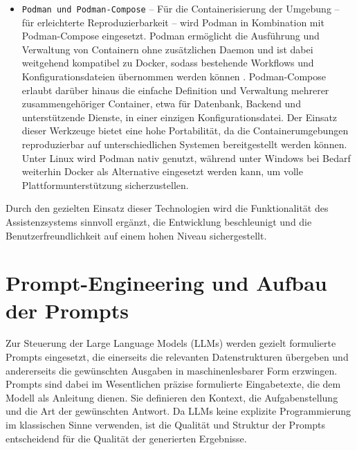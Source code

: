 \begin{itemize}
          \item \texttt{Podman und Podman-Compose} – Für die Containerisierung der Umgebung -- für erleichterte Reproduzierbarkeit -- wird Podman in Kombination mit Podman-Compose eingesetzt.
          Podman ermöglicht die Ausführung und Verwaltung von Containern ohne zusätzlichen Daemon und ist dabei weitgehend kompatibel zu Docker, sodass bestehende Workflows und Konfigurationsdateien übernommen werden können \autocite{podman_docs_2025}.
          Podman-Compose erlaubt darüber hinaus die einfache Definition und Verwaltung mehrerer zusammengehöriger Container, etwa für Datenbank, Backend und unterstützende Dienste, in einer einzigen Konfigurationsdatei.
          Der Einsatz dieser Werkzeuge bietet eine hohe Portabilität, da die Containerumgebungen reproduzierbar auf unterschiedlichen Systemen bereitgestellt werden können.
          Unter Linux wird Podman nativ genutzt, während unter Windows bei Bedarf weiterhin Docker als Alternative eingesetzt werden kann, um volle Plattformunterstützung sicherzustellen.

      \end{itemize}

      Durch den gezielten Einsatz dieser Technologien wird die Funktionalität des Assistenzsystems sinnvoll ergänzt, die Entwicklung beschleunigt und die Benutzerfreundlichkeit auf einem hohen Niveau sichergestellt.


  \section{Prompt-Engineering und Aufbau der Prompts}

    Zur Steuerung der Large Language Models (\acs{LLM}s) werden gezielt formulierte Prompts eingesetzt, die einerseits die relevanten Datenstrukturen übergeben und andererseits die gewünschten Ausgaben in maschinenlesbarer Form erzwingen.
    Prompts sind dabei im Wesentlichen präzise formulierte Eingabetexte, die dem Modell als Anleitung dienen.
    Sie definieren den Kontext, die Aufgabenstellung und die Art der gewünschten Antwort.
    Da \acs{LLM}s keine explizite Programmierung im klassischen Sinne verwenden, ist die Qualität und Struktur der Prompts entscheidend für die Qualität der generierten Ergebnisse.


